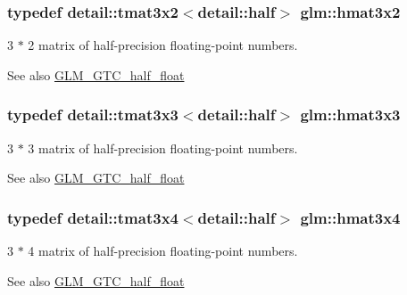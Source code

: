 \subsubsection[{hmat3x2}]{\setlength{\rightskip}{0pt plus 5cm}typedef detail\+::tmat3x2$<$detail\+::half$>$ {\bf glm\+::hmat3x2}}\label{group__gtc__half__float_ga70ae0376caa86bce1c8df390c7211321}
3 $\ast$ 2 matrix of half-\/precision floating-\/point numbers. \begin{DoxySeeAlso}{See also}
\hyperlink{group__gtc__half__float}{G\+L\+M\+\_\+\+G\+T\+C\+\_\+half\+\_\+float} 
\end{DoxySeeAlso}
\hypertarget{group__gtc__half__float_ga074b3f26b6be3af8ac817a2c4eba8434}{}
\subsubsection[{hmat3x3}]{\setlength{\rightskip}{0pt plus 5cm}typedef detail\+::tmat3x3$<$detail\+::half$>$ {\bf glm\+::hmat3x3}}\label{group__gtc__half__float_ga074b3f26b6be3af8ac817a2c4eba8434}
3 $\ast$ 3 matrix of half-\/precision floating-\/point numbers. \begin{DoxySeeAlso}{See also}
\hyperlink{group__gtc__half__float}{G\+L\+M\+\_\+\+G\+T\+C\+\_\+half\+\_\+float} 
\end{DoxySeeAlso}
\hypertarget{group__gtc__half__float_gabde8c0dd3585490525f0d2b2da25e24a}{}
\subsubsection[{hmat3x4}]{\setlength{\rightskip}{0pt plus 5cm}typedef detail\+::tmat3x4$<$detail\+::half$>$ {\bf glm\+::hmat3x4}}\label{group__gtc__half__float_gabde8c0dd3585490525f0d2b2da25e24a}
3 $\ast$ 4 matrix of half-\/precision floating-\/point numbers. \begin{DoxySeeAlso}{See also}
\hyperlink{group__gtc__half__float}{G\+L\+M\+\_\+\+G\+T\+C\+\_\+half\+\_\+float} 
\end{DoxySeeAlso}
\hypertarget{group__gtc__half__float_gaf5091515fa8c775f1e511d1e6790e968}{}
